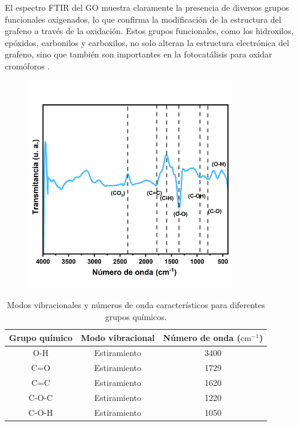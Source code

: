 \documentclass[12pt]{article}
\begin{document}
El espectro FTIR del GO muestra claramente la presencia de diversos grupos funcionales oxigenados, lo que confirma la modificación de la estructura del grafeno a través de la oxidación. Estos grupos funcionales, como los hidroxilos, epóxidos, carbonilos y carboxilos, no solo alteran la estructura electrónica del grafeno, sino que también son importantes en la fotocatálisis para oxidar cromóforos \cite{IEEEreferencias:GO_GOr}.
\begin{figure}[H]
    	   \begin{center}
     	  	\includegraphics[width = 0.8\textwidth]{Imagenes/GO_FTIR.png}
    	   \end{center} 
        \end{figure}


        \begin{table}[h!]
\centering
\caption{Modos vibracionales y números de onda característicos para diferentes grupos químicos.}
\begin{tabular}{|c|c|c|}
\hline
\textbf{Grupo químico} & \textbf{Modo vibracional} & \textbf{Número de onda} ($\text{cm}^{-1}$) \\ \hline
O-H                    & Estiramiento              & 3400                                        \\ \hline
C=O                    & Estiramiento              & 1729                                        \\ \hline
C=C                    & Estiramiento              & 1620                                        \\ \hline
C-O-C                  & Estiramiento              & 1220                                        \\ \hline
C-O-H                  & Estiramiento              & 1050                                        \\ \hline

\end{tabular}
\label{tab:modos_vibracionales}
\end{table}
\end{document}
